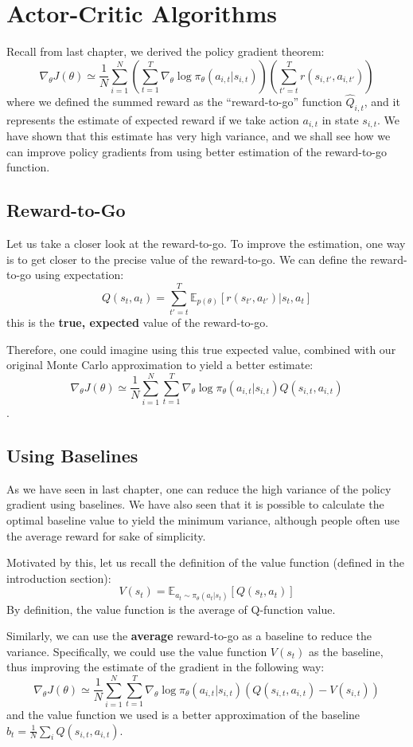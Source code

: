 \chapter{Actor-Critic Algorithms}
Recall from last chapter, we derived the policy gradient theorem:
$$\nabla_\theta J(\theta) \simeq \frac{1}{N}\sum_{i=1}^N\left(\sum_{t=1}^T\nabla_\theta \log\pi_\theta(a_{i,t}|s_{i,t})\right)\left(\sum_{t'=t}^T r(s_{i,t'},a_{i,t'})\right)$$
where we defined the summed reward as the ``reward-to-go'' function $\hat{Q}_{i,t}$, and it represents the estimate of expected reward if we take action $a_{i,t}$ in state $s_{i,t}$. We have shown that this estimate has very high variance, and we shall see how we can improve policy gradients from using better estimation of the reward-to-go function.

\section{Reward-to-Go}
Let us take a closer look at the reward-to-go. To improve the estimation, one way is to get closer to the precise value of the reward-to-go. We can define the reward-to-go using expectation:
$$Q(s_t,a_t) = \sum_{t'=t}^T \mathbb{E}_{p(\theta)}\left[r(s_{t'},a_{t'})|s_t,a_t\right]$$
this is the \textbf{true, expected} value of the reward-to-go.

Therefore, one could imagine using this true expected value, combined with our original Monte Carlo approximation to yield a better estimate:
$$\nabla_\theta J(\theta) \simeq \frac{1}{N}\sum_{i=1}^N\sum_{t=1}^T\nabla_{\theta}\log \pi_\theta (a_{i,t}|s_{i,t})Q(s_{i,t},a_{i,t})$$.

\section{Using Baselines}
As we have seen in last chapter, one can reduce the high variance of the policy gradient using baselines. We have also seen that it is possible to calculate the optimal baseline value to yield the minimum variance, although people often use the average reward for sake of simplicity.

Motivated by this, let us recall the definition of the value function (defined in the introduction section):
$$V(s_t) = \mathbb{E}_{a_t\sim \pi_\theta(a_t|s_t)}\left[Q(s_t,a_t)\right]$$
By definition, the value function is the average of Q-function value.

Similarly, we can use the \textbf{average} reward-to-go as a baseline to reduce the variance. Specifically, we could use the value function $V(s_t)$ as the baseline, thus improving the estimate of the gradient in the following way:
$$\nabla_\theta J(\theta) \simeq \frac{1}{N}\sum_{i=1}^N\sum_{t=1}^T\nabla_{\theta}\log \pi_\theta (a_{i,t}|s_{i,t})\left(Q(s_{i,t},a_{i,t}) - V(s_{i,t})\right)$$
and the value function we used is a better approximation of the baseline $b_t = \frac{1}{N}\sum_i Q(s_{i,t},a_{i,t})$.

